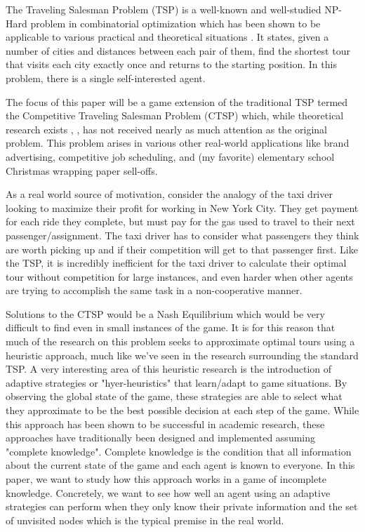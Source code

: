 \documentclass[pageno]{jpaper}
\begin{document}
The Traveling Salesman Problem (TSP) is a well-known and well-studied NP-Hard problem in combinatorial optimization which has been shown to be applicable to various practical and theoretical situations  \cite{7956764}. It states, given a number of cities and distances between each pair of them, find the shortest tour that visits each city exactly once and returns to the starting position. In this problem, there is a single self-interested agent.\par

The focus of this paper will be a game extension of the traditional TSP termed the Competitive Traveling Salesman Problem (CTSP) which, while theoretical research exists \cite{FEKETE2004377}, \cite{QU20071009}, has not received nearly as much attention as the original problem. This problem arises in various other real-world applications like brand advertising, competitive job scheduling, and (my favorite) elementary school Christmas wrapping paper sell-offs.\par

As a real world source of motivation, consider the analogy of the taxi driver looking to maximize their profit for working in New York City. They get payment for each ride they complete, but must pay for the gas used to travel to their next passenger/assignment. The taxi driver has to consider what passengers they think are worth picking up and if their competition will get to that passenger first. Like the TSP, it is incredibly inefficient for the taxi driver to calculate their optimal tour without competition for large instances, and even harder when other agents are trying to accomplish the same task in a non-cooperative manner. \par

Solutions to the CTSP would be a Nash Equilibrium which would be very difficult to find even in small instances of the game\cite{10.2307/23355415}. It is for this reason that much of the research on this problem seeks to approximate optimal tours using a heuristic approach, much like we've seen in the research surrounding the standard TSP. A very interesting area of this heuristic research is the introduction of adaptive strategies or "hyer-heuristics" that learn/adapt to game situations. By observing the global state of the game, these strategies are able to select what they approximate to be the best possible decision at each step of the game. While this approach has been shown to be successful in academic research, these approaches have traditionally been designed and implemented assuming "complete knowledge". Complete knowledge is the condition that all information about the current state of the game and each agent is known to everyone. In this paper, we want to study how this approach works in a game of incomplete knowledge. Concretely, we want to see how well an agent using an adaptive strategies can perform when they only know their private information and the set of unvisited nodes which is the typical premise in the real world.\par
\end{document}
